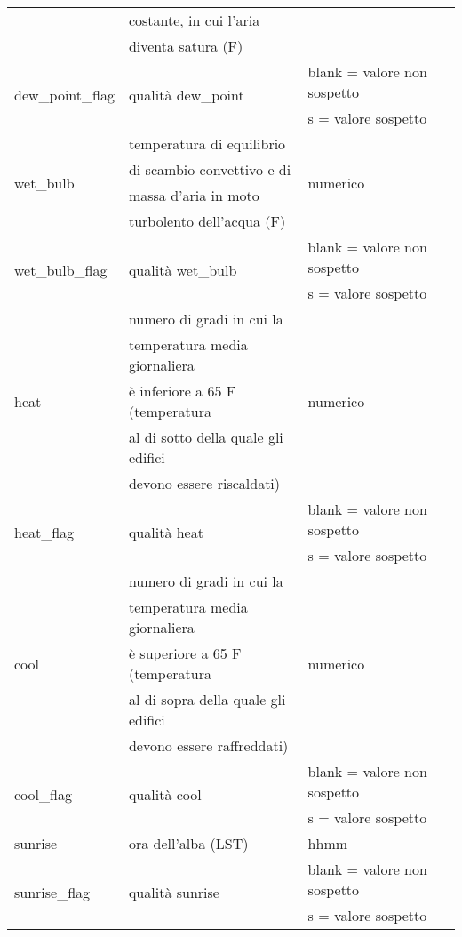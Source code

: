 \begin{longtable}{lll}
	&  costante, in cui l'aria  &\\
	& diventa satura (\degree F) &		\\
	\hline
	\multirow{2}{*}{dew\_point\_flag}		& \multirow{2}{*}{qualità dew\_point} & blank = valore non sospetto \\
	& & s = valore sospetto			 \\ 
	\hline
	\multirow{4}{*}{wet\_bulb}	& temperatura di equilibrio     & 	\multirow{4}{*}{numerico}	   	\\ 
	& di scambio convettivo e di   &\\
	& massa d'aria in moto & \\
	& turbolento dell'acqua (\degree F)&\\
	\hline
	\multirow{2}{*}{wet\_bulb\_flag}		& \multirow{2}{*}{qualità wet\_bulb} &  blank = valore non sospetto \\
	& & s = valore sospetto			 \\ 
	\hline
	\multirow{5}{*}{heat}	& numero di gradi in cui la   & 	\multirow{5}{*}{numerico}	   	\\ 
	& temperatura media giornaliera  &\\
	& è inferiore a 65 \degree F (temperatura   &\\
	& al di sotto della quale gli edifici  & \\
	& devono essere riscaldati) &\\
	\hline
	\multirow{2}{*}{heat\_flag}		& \multirow{2}{*}{qualità heat} &  blank = valore non sospetto \\
	& & s = valore sospetto			 \\ 
	\hline		
	\multirow{5}{*}{cool}	& numero di gradi in cui la    & 	\multirow{5}{*}{numerico}	   	\\ 
	& temperatura media giornaliera   &\\
	& è superiore a 65 \degree F (temperatura  &\\
	& al di sopra della quale gli edifici  &\\
	& devono essere raffreddati) &\\
	\hline
	\multirow{2}{*}{cool\_flag}		& \multirow{2}{*}{qualità cool} &  blank = valore non sospetto \\
	& & s = valore sospetto			 \\ 
	\hline		
	sunrise				& ora dell'alba (LST)	 & hhmm		   	\\ 
	\hline
	\multirow{2}{*}{sunrise\_flag}		& \multirow{2}{*}{qualità sunrise} &  blank = valore non sospetto \\
	& & s = valore sospetto			 \\ 

\end{longtable}
